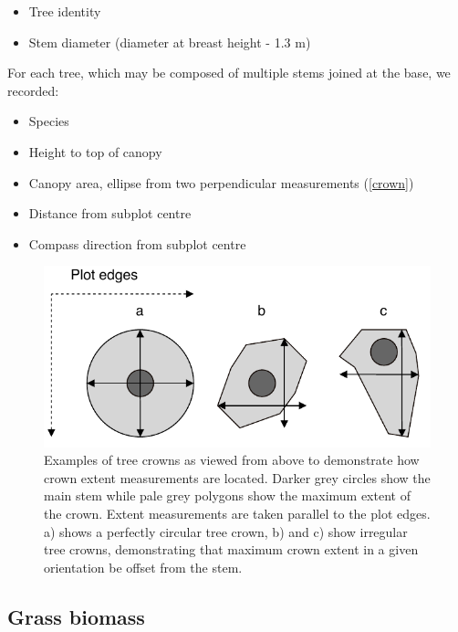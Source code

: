 \documentclass[11pt,a4paper]{article}
\begin{document}
\begin{itemize}
	\item{Tree identity}
	\item{Stem diameter (diameter at breast height - 1.3 m)}
\end{itemize}

For each tree, which may be composed of multiple stems joined at the base, we recorded: 

\begin{itemize}
	\item{Species}
	\item{Height to top of canopy}
	\item{Canopy area, ellipse from two perpendicular measurements (\autoref{crown})}
	\item{Distance from subplot centre}
	\item{Compass direction from subplot centre}
\end{itemize}

\begin{figure}[H]
\centering
	\includegraphics[width=\textwidth]{crown}
	\caption{Examples of tree crowns as viewed from above to demonstrate how crown extent measurements are located. Darker grey circles show the main stem while pale grey polygons show the maximum extent of the crown. Extent measurements are taken parallel to the plot edges. a) shows a perfectly circular tree crown, b) and c) show irregular tree crowns, demonstrating that maximum crown extent in a given orientation be offset from the stem.}
	\label{crown}
\end{figure}

\subsection{Grass biomass} 
\end{document}
